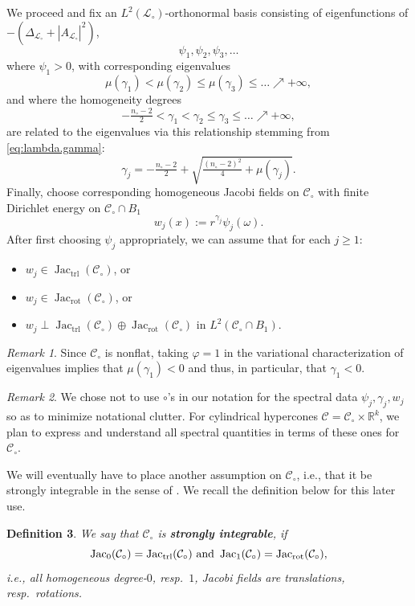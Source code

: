 \documentclass[11pt, letterpaper, reqno]{amsart}
\numberwithin{equation}{section}
\newtheorem{Def}{Definition}[section]
\theoremstyle{remark}
\newtheorem{Rem}[Def]{Remark}
\newcommand{\RR}{\mathbb{R}}
\newcommand{\cC}{\mathcal{C}}
\newcommand{\cL}{\mathcal{L}}
\newcommand{\Jac}{\operatorname{Jac}}
\begin{document}
We proceed and fix an $L^2(\cL_\circ)$-orthonormal basis consisting of eigenfunctions of $-(\Delta_{\cL_\circ} + |A_{\cL_\circ}|^2)$,
\[ \psi_1, \psi_2, \psi_3, \ldots \]
where $\psi_1>0$, with corresponding eigenvalues 
\[ \mu(\gamma_1) < \mu(\gamma_2) \leq \mu(\gamma_3) \leq \ldots \nearrow +\infty, \]
and where the homogeneity degrees
\[ -\tfrac{n_\circ-2}{2} < \gamma_1< \gamma_2\leq \gamma_3\leq \dots \nearrow +\infty, \]
are related to the eigenvalues via this relationship stemming from \eqref{eq:lambda.gamma}:
\[ \gamma_j = - \tfrac{n_\circ-2}{2} + \sqrt{\tfrac{(n_\circ-2)^2}{4} + \mu(\gamma_j)}. \]
Finally, choose corresponding homogeneous Jacobi fields on $\cC_\circ$ with finite Dirichlet energy on $\cC_\circ\cap B_1$
\[ w_j(x) := r^{\gamma_j}\psi_j(\omega). \]
After first choosing $\psi_j$ appropriately, we can assume that for each $j\geq 1$:
\begin{itemize}
	\item $w_j \in \Jac_\textrm{trl}(\cC_\circ)$, or
	\item $w_j \in \Jac_\textrm{rot}(\cC_\circ)$, or
	\item $w_j\perp \Jac_\textrm{trl}(\cC_\circ) \oplus \Jac_\textrm{rot}(\cC_\circ)$ in $L^2(\cC_\circ \cap B_1)$.
\end{itemize}

\begin{Rem} \label{rema:gamma1.negative}
	Since $\cC_\circ$ is nonflat, taking $\varphi =1$ in the variational characterization of eigenvalues implies that $\mu(\gamma_1) < 0$ and thus, in particular, that $\gamma_1 < 0$.
\end{Rem}

\begin{Rem}
    We chose not to use $\circ$'s in our notation for the spectral data $\psi_j, \gamma_j, w_j$ so as to minimize notational clutter. For cylindrical hypercones $\cC = \cC_\circ \times \RR^k$, we plan to express and understand all spectral quantities in terms of these ones for $\cC_\circ$.
\end{Rem}

We will eventually have to place another assumption on $\cC_\circ$, i.e., that it be strongly integrable in the sense of \cite{Simon:uniqueness.some}. We recall the definition below for this later use.
    
\begin{Def} \label{defi:strongly.integrable}
	We say that $\cC_\circ$ is \textbf{strongly integrable}, if
	\[ \Jac_0(\cC_\circ) = \Jac_\textnormal{trl}(\cC_\circ) \text{ and } \Jac_1(\cC_\circ) = \Jac_\textnormal{rot}(\cC_\circ), \]
	i.e., all homogeneous degree-$0$, resp.\ $1$, Jacobi fields are translations, resp.\ rotations.
\end{Def}
\end{document}
